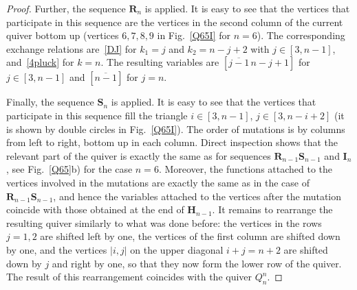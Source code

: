 \documentclass[10pt,a4paper]{amsart}
\def\Hs{\mathbf H}
\def\Is{\mathbf I}
\def\Rs{\mathbf R}
\def\S{{\mathbf S}}
\begin{document}
\begin{proof}
Further, the sequence $\Rs_n$ is applied. It is easy to see that the vertices that participate in this sequence are the vertices in the second column of the current quiver bottom up (vertices $6, 7, 8, 9$ in Fig.~\ref{Q65I} for $n=6$). The corresponding exchange relations are~\eqref{DJ} for
$k_1=j$ and $k_2=n-j+2$ with $j\in[3,n-1]$, and~\eqref{4pluck} for $k=n$. The resulting variables are $[\overline{j-1}\,
n-j+1]$ for $j\in[3,n-1]$ and $[\overline{n-1}]$ for $j=n$.

Finally, the sequence $\S_n$ is applied. It is easy to see that the vertices that participate in this sequence fill the triangle $i\in[3,n-1]$, $j\in[3,n-i+2]$ (it is shown by double circles in Fig.~\ref{Q65I}). The order of mutations is 
by columns from left to right, bottom up in each column. Direct inspection shows that the relevant part of the quiver is exactly the same as for sequences $\Rs_{n-1}\S_{n-1}$ and $\Is_n$, see Fig.~\ref{Q65}b) for the case $n=6$. Moreover, 
the functions attached to the vertices involved in the mutations are exactly the same as in the case of $\Rs_{n-1}\S_{n-1}$, and hence the variables attached to the vertices after the mutation coincide with those obtained at the end of $\Hs_{n-1}$. It remains to rearrange the resulting quiver similarly to what was done before: the vertices in the rows $j=1,2$ 
are shifted left by one, the vertices of the first column are shifted down by one,  and the vertices $|i,j|$ on the upper diagonal $i+j=n+2$ are shifted down by $j$ and right by one, so that they now form the lower row of the quiver. The result of this rearrangement coincides with the quiver $Q_n^n$.
\end{proof}
\end{document}

